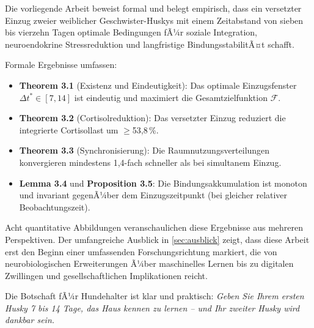 ﻿\documentclass[12pt, a4paper]{article}
\theoremstyle{plain}
\theoremstyle{definition}
\theoremstyle{remark}
\newcommand{\dt}{\Delta t}
\begin{document}
Die vorliegende Arbeit beweist formal und belegt empirisch, dass ein versetzter
Einzug zweier weiblicher Geschwister-Huskys mit einem Zeitabstand von sieben
bis vierzehn Tagen optimale Bedingungen fÃ¼r soziale Integration,
neuroendokrine Stressreduktion und langfristige BindungsstabilitÃ¤t schafft.

Formale Ergebnisse umfassen:
\begin{itemize}[leftmargin=*]
  \item \textbf{Theorem 3.1} (Existenz und Eindeutigkeit): Das optimale
    Einzugsfenster $\dt^* \in [7, 14]$ ist eindeutig und maximiert die
    Gesamtzielfunktion $\mathcal{F}$.
  \item \textbf{Theorem 3.2} (Cortisolreduktion): Das versetzter Einzug
    reduziert die integrierte Cortisollast um $\geq$53{,}8\,\%.
  \item \textbf{Theorem 3.3} (Synchronisierung): Die Raumnutzungsverteilungen
    konvergieren mindestens 1{,}4-fach schneller als bei simultanem Einzug.
  \item \textbf{Lemma 3.4} und \textbf{Proposition 3.5}: Die Bindungsakkumulation
    ist monoton und invariant gegenÃ¼ber dem Einzugszeitpunkt (bei gleicher
    relativer Beobachtungszeit).
\end{itemize}

Acht quantitative Abbildungen veranschaulichen diese Ergebnisse aus mehreren
Perspektiven. Der umfangreiche Ausblick in \cref{sec:ausblick} zeigt, dass
diese Arbeit erst den Beginn einer umfassenden Forschungsrichtung markiert,
die von neurobiologischen Erweiterungen Ã¼ber maschinelles Lernen bis zu
digitalen Zwillingen und gesellschaftlichen Implikationen reicht.

Die Botschaft fÃ¼r Hundehalter ist klar und praktisch: \emph{Geben Sie
Ihrem ersten Husky 7 bis 14 Tage, das Haus kennen zu lernen -- und Ihr zweiter
Husky wird dankbar sein.}

\printbibliography[heading=bibintoc, title={Literatur}]
\end{document}
